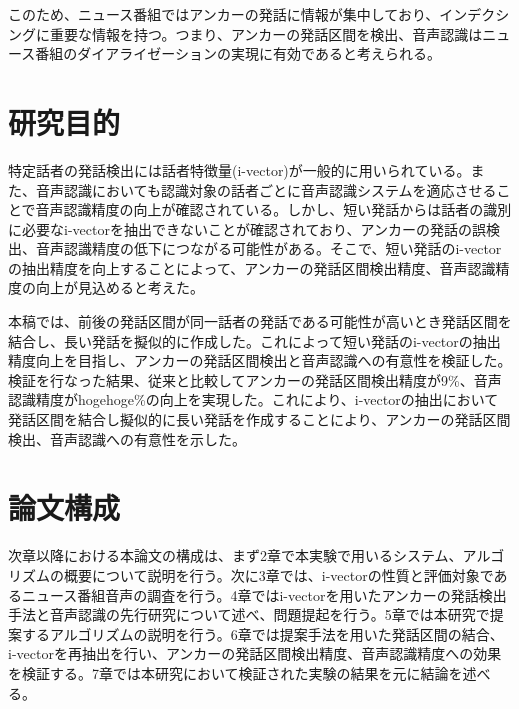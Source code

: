\noindent このため、ニュース番組ではアンカーの発話に情報が集中しており、インデクシングに重要な情報を持つ。つまり、アンカーの発話区間を検出、音声認識はニュース番組のダイアライゼーションの実現に有効であると考えられる。

\section{研究目的}
特定話者の発話検出には話者特徴量(i-vector)が一般的に用いられている。また、音声認識においても認識対象の話者ごとに音声認識システムを適応させることで音声認識精度の向上が確認されている。しかし、短い発話からは話者の識別に必要なi-vectorを抽出できないことが確認されており\cite{panaiv}、アンカーの発話の誤検出、音声認識精度の低下につながる可能性がある。そこで、短い発話のi-vectorの抽出精度を向上することによって、アンカーの発話区間検出精度、音声認識精度の向上が見込めると考えた。\par
本稿では、前後の発話区間が同一話者の発話である可能性が高いとき発話区間を結合し、長い発話を擬似的に作成した。これによって短い発話のi-vectorの抽出精度向上を目指し、アンカーの発話区間検出と音声認識への有意性を検証した。検証を行なった結果、従来と比較してアンカーの発話区間検出精度が9\%、音声認識精度がhogehoge\%の向上を実現した。これにより、i-vectorの抽出において発話区間を結合し擬似的に長い発話を作成することにより、アンカーの発話区間検出、音声認識への有意性を示した。

\section{論文構成}
次章以降における本論文の構成は、まず2章で本実験で用いるシステム、アルゴリズムの概要について説明を行う。次に3章では、i-vectorの性質と評価対象であるニュース番組音声の調査を行う。4章ではi-vectorを用いたアンカーの発話検出手法と音声認識の先行研究について述べ、問題提起を行う。5章では本研究で提案するアルゴリズムの説明を行う。6章では提案手法を用いた発話区間の結合、i-vectorを再抽出を行い、アンカーの発話区間検出精度、音声認識精度への効果を検証する。7章では本研究において検証された実験の結果を元に結論を述べる。

